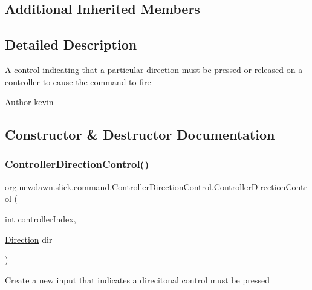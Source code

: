 \subsection*{Additional Inherited Members}


\subsection{Detailed Description}
A control indicating that a particular direction must be pressed or released on a controller to cause the command to fire

\begin{DoxyAuthor}{Author}
kevin 
\end{DoxyAuthor}


\subsection{Constructor \& Destructor Documentation}
\mbox{\label{classorg_1_1newdawn_1_1slick_1_1command_1_1_controller_direction_control_acff75723de333500eccdd3b0bf023ac8}} 
\subsubsection{\texorpdfstring{Controller\+Direction\+Control()}{ControllerDirectionControl()}}
{\footnotesize\ttfamily org.\+newdawn.\+slick.\+command.\+Controller\+Direction\+Control.\+Controller\+Direction\+Control (\begin{DoxyParamCaption}\item[{int}]{controller\+Index,  }\item[{\mbox{\hyperlink{classorg_1_1newdawn_1_1slick_1_1command_1_1_controller_direction_control_1_1_direction}{Direction}}}]{dir }\end{DoxyParamCaption})\hspace{0.3cm}{\ttfamily [inline]}}

Create a new input that indicates a direcitonal control must be pressed


